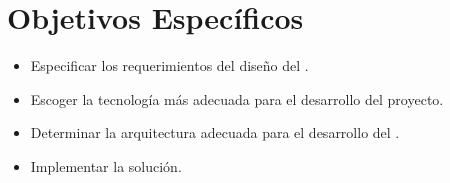 
	\section{Objetivos Específicos}\label{cap:intro:objetivos}

		\begin{itemize}
			\item Especificar los requerimientos del diseño del \frameworkPC.
			\item Escoger la tecnología más adecuada para el desarrollo del proyecto.
			\item Determinar la arquitectura adecuada para el desarrollo del \frameworkPC.
			\item Implementar la solución.
		\end{itemize}


